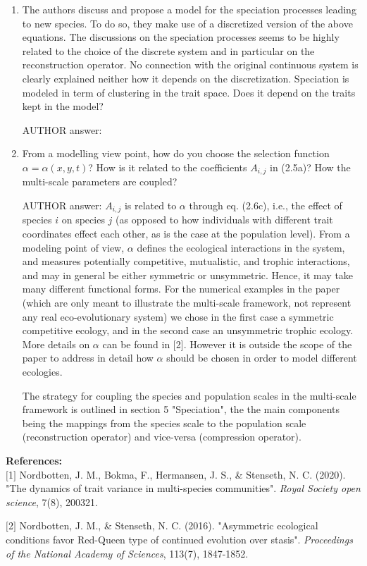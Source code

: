 \documentclass[a4paper,11pt]{scrartcl}
\begin{document}
\begin{enumerate}
\item
The authors discuss and propose a model for the speciation processes leading to new species. To do so, they make use of a discretized version of the above equations. The discussions on the speciation processes seems to be highly related to the choice of the discrete system and in particular on the reconstruction operator. No connection with the original continuous system is clearly explained neither how it depends on the discretization.
Speciation is modeled in term of clustering in the trait space. Does it depend on the traits kept in the model?

AUTHOR answer:

\item
From a modelling view point, how do you choose the selection function $\alpha=\alpha(x,y,t)$? How is it related to the coefficients $A_{i,j}$ in (2.5a)? How the multi-scale parameters are coupled?

AUTHOR answer: $A_{i,j}$ is related to $\alpha$ through eq. (2.6c), i.e., the effect of species $i$ on species $j$ (as opposed to how individuals with different trait coordinates effect each other, as is the case at the population level). From a modeling point of view, $\alpha$ defines the ecological interactions in the system, and measures potentially competitive, mutualistic, and trophic interactions, and may in general be either symmetric or unsymmetric. Hence, it may take many different functional forms. For the numerical examples in the paper (which are only meant to illustrate the multi-scale framework, not represent any real eco-evolutionary system) we chose in the first case a symmetric competitive ecology, and in the second case an unsymmetric trophic ecology. More details on $\alpha$ can be found in [2]. However it is outside the scope of the paper to address in detail how $\alpha$ should be chosen in order to model different ecologies.

The strategy for coupling the species and population scales in the multi-scale framework is outlined in section 5 "Speciation", the the main components being the mappings from the species scale to the population scale (reconstruction operator) and vice-versa (compression operator).
\end{enumerate}

\textbf{References:}\\

$[$1$]$ Nordbotten, J. M., Bokma, F., Hermansen, J. S., \& Stenseth, N. C. (2020). "The dynamics of trait variance in multi-species communities". \textit{Royal Society open science}, 7(8), 200321. 

$[$2$]$ Nordbotten, J. M., \& Stenseth, N. C. (2016). "Asymmetric ecological conditions favor Red-Queen type of continued evolution over stasis". \textit{Proceedings of the National Academy of Sciences}, 113(7), 1847-1852.
\end{document}
